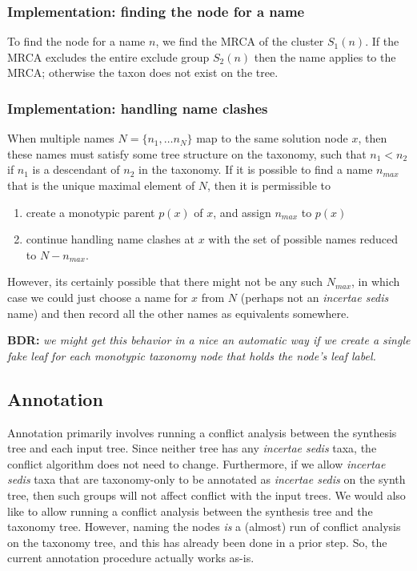 \documentclass[english]{article}
\begin{document}
\subsubsection{Implementation: finding the node for a name}

To find the node for a name $n$, we find the MRCA of the cluster
$S_{1}(n)$.
If the MRCA excludes the entire exclude group $S_{2}(n)$
then the name applies to the MRCA; otherwise the taxon does not exist
on the tree.

\subsubsection{Implementation: handling name clashes}

When multiple names $N=\{n_{1},\ldots n_{N}\}$ map to the same
solution node $x$, then these names must satisfy some tree structure
on the taxonomy, such that $n_{1}<n_{2}$ if $n_{1}$ is a descendant of
$n_{2}$ in the taxonomy.
If it is possible to find a name $n_{max}$
that is the unique maximal element of $N$, then it is permissible to
\begin{enumerate}
    \item create a monotypic parent $p(x)$ of $x$, and
assign $n_{max}$ to $p(x)$ 
    \item continue handling name clashes at $x$
with the set of possible names reduced to $N-n_{max}$.

\end{enumerate}
However, its certainly possible that there might not be any such
$N_{max}$, in which case we could just choose a name for $x$ from $N$
(perhaps not an \emph{incertae sedis} name) and then record all the
other names as equivalents somewhere.

\textbf{BDR:}\textbf{\emph{ }}\emph{we might get this behavior in a
nice an automatic way if we create a single fake leaf for each
monotypic taxonomy node that holds the node's leaf label.}


\subsection{Annotation}

Annotation primarily involves running a conflict analysis between the
synthesis tree and each input tree.
Since neither tree has any
\emph{incertae sedis} taxa, the conflict algorithm does not need to
change.
Furthermore, if we allow \emph{incertae sedis} taxa that are
taxonomy-only to be annotated as \emph{incertae sedis} on the synth
tree, then such groups will not affect conflict with the input trees.
We would also like to allow running a conflict analysis between the
synthesis tree and the taxonomy tree.
However, naming the nodes
\emph{is} a (almost) run of conflict analysis on the taxonomy tree,
and this has already been done in a prior step.
So, the current
annotation procedure actually works as-is.
\end{document}
